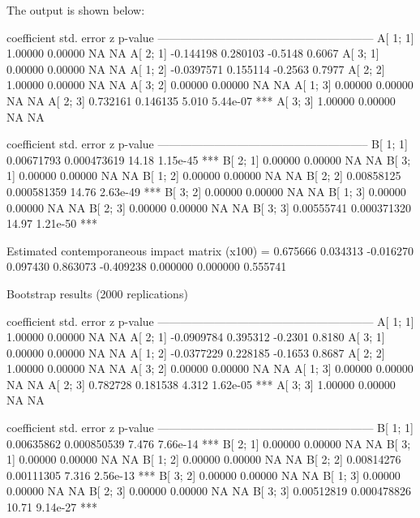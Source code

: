 \documentclass[a4paper,10pt]{article}
\begin{document}
The output is shown below:

\begin{code}
             coefficient   std. error      z       p-value 
  ---------------------------------------------------------
  A[ 1; 1]    1.00000       0.00000     NA        NA       
  A[ 2; 1]   -0.144198      0.280103    -0.5148    0.6067  
  A[ 3; 1]    0.00000       0.00000     NA        NA       
  A[ 1; 2]   -0.0397571     0.155114    -0.2563    0.7977  
  A[ 2; 2]    1.00000       0.00000     NA        NA       
  A[ 3; 2]    0.00000       0.00000     NA        NA       
  A[ 1; 3]    0.00000       0.00000     NA        NA       
  A[ 2; 3]    0.732161      0.146135     5.010     5.44e-07 ***
  A[ 3; 3]    1.00000       0.00000     NA        NA       


             coefficient   std. error      z      p-value 
  --------------------------------------------------------
  B[ 1; 1]   0.00671793    0.000473619   14.18    1.15e-45 ***
  B[ 2; 1]   0.00000       0.00000       NA      NA       
  B[ 3; 1]   0.00000       0.00000       NA      NA       
  B[ 1; 2]   0.00000       0.00000       NA      NA       
  B[ 2; 2]   0.00858125    0.000581359   14.76    2.63e-49 ***
  B[ 3; 2]   0.00000       0.00000       NA      NA       
  B[ 1; 3]   0.00000       0.00000       NA      NA       
  B[ 2; 3]   0.00000       0.00000       NA      NA       
  B[ 3; 3]   0.00555741    0.000371320   14.97    1.21e-50 ***

Estimated contemporaneous impact matrix (x100) =
  0.675666  0.034313 -0.016270
  0.097430  0.863073 -0.409238
  0.000000  0.000000  0.555741

Bootstrap results (2000 replications)

             coefficient   std. error      z       p-value 
  ---------------------------------------------------------
  A[ 1; 1]    1.00000       0.00000     NA        NA       
  A[ 2; 1]   -0.0909784     0.395312    -0.2301    0.8180  
  A[ 3; 1]    0.00000       0.00000     NA        NA       
  A[ 1; 2]   -0.0377229     0.228185    -0.1653    0.8687  
  A[ 2; 2]    1.00000       0.00000     NA        NA       
  A[ 3; 2]    0.00000       0.00000     NA        NA       
  A[ 1; 3]    0.00000       0.00000     NA        NA       
  A[ 2; 3]    0.782728      0.181538     4.312     1.62e-05 ***
  A[ 3; 3]    1.00000       0.00000     NA        NA       


             coefficient   std. error      z       p-value 
  ---------------------------------------------------------
  B[ 1; 1]   0.00635862    0.000850539    7.476    7.66e-14 ***
  B[ 2; 1]   0.00000       0.00000       NA       NA       
  B[ 3; 1]   0.00000       0.00000       NA       NA       
  B[ 1; 2]   0.00000       0.00000       NA       NA       
  B[ 2; 2]   0.00814276    0.00111305     7.316    2.56e-13 ***
  B[ 3; 2]   0.00000       0.00000       NA       NA       
  B[ 1; 3]   0.00000       0.00000       NA       NA       
  B[ 2; 3]   0.00000       0.00000       NA       NA       
  B[ 3; 3]   0.00512819    0.000478826   10.71     9.14e-27 ***
\end{code}
\end{document}
